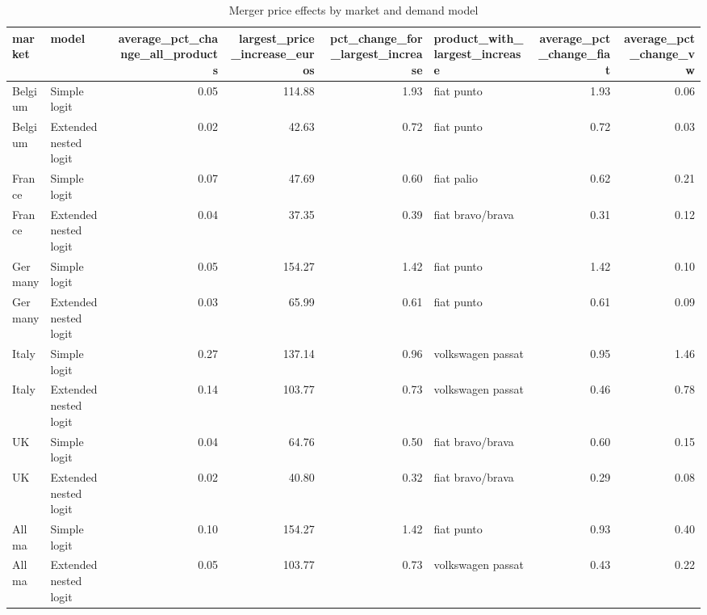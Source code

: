 \begin{table}
\caption{Merger price effects by market and demand model}
\label{tab:merger_overview}
\begin{tabular}{llrrrlrr}
\toprule
market & model & average\_pct\_change\_all\_products & largest\_price\_increase\_euros & pct\_change\_for\_largest\_increase & product\_with\_largest\_increase & average\_pct\_change\_fiat & average\_pct\_change\_vw \\
\midrule
Belgium & Simple logit & 0.05 & 114.88 & 1.93 & fiat punto & 1.93 & 0.06 \\
Belgium & Extended nested logit & 0.02 & 42.63 & 0.72 & fiat punto & 0.72 & 0.03 \\
France & Simple logit & 0.07 & 47.69 & 0.60 & fiat palio & 0.62 & 0.21 \\
France & Extended nested logit & 0.04 & 37.35 & 0.39 & fiat bravo/brava & 0.31 & 0.12 \\
Germany & Simple logit & 0.05 & 154.27 & 1.42 & fiat punto & 1.42 & 0.10 \\
Germany & Extended nested logit & 0.03 & 65.99 & 0.61 & fiat punto & 0.61 & 0.09 \\
Italy & Simple logit & 0.27 & 137.14 & 0.96 & volkswagen passat & 0.95 & 1.46 \\
Italy & Extended nested logit & 0.14 & 103.77 & 0.73 & volkswagen passat & 0.46 & 0.78 \\
UK & Simple logit & 0.04 & 64.76 & 0.50 & fiat bravo/brava & 0.60 & 0.15 \\
UK & Extended nested logit & 0.02 & 40.80 & 0.32 & fiat bravo/brava & 0.29 & 0.08 \\
All ma & Simple logit & 0.10 & 154.27 & 1.42 & fiat punto & 0.93 & 0.40 \\
All ma & Extended nested logit & 0.05 & 103.77 & 0.73 & volkswagen passat & 0.43 & 0.22 \\
\bottomrule
\end{tabular}
\end{table}
